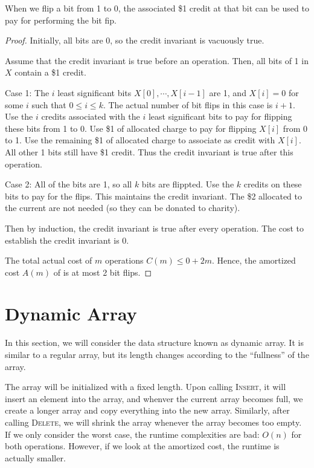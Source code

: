When we flip a bit from 1 to 0, the associated \$1 credit at that bit can be used to pay for performing the bit fip.

\begin{proof}
    Initially, all bits are 0, so the credit invariant is vacuously true.

    Assume that the credit invariant is true before an  operation. Then, all bits of 1 in $X$ contain a \$1 credit.

    Case 1: The $i$ least significant bits $X[0],\cdots,X[i-1]$ are 1, and $X[i] = 0$ for some $i$ such that $0 \leq i \leq k$. The actual number of bit flips in this case is $i+1$. Use the $i$ credits associated with the $i$ least significant bits to pay for flipping these bits from 1 to 0. Use \$1 of allocated charge to pay for flipping $X[i]$ from 0 to 1. Use the remaining \$1 of allocated charge to associate as credit with $X[i]$. All other 1 bits still have \$1 credit. Thus the credit invariant is true after this  operation.

    Case 2: All of the bits are 1, so all $k$ bits are flippted. Use the $k$ credits on these bits to pay for the flips. This maintains the credit invariant. The \$2 allocated to the current  are not needed (so they can be donated to charity).

    Then by induction, the credit invariant is true after every  operation. The cost to establish the credit invariant is 0.

    The total actual cost of $m$ operations $C(m) \leq 0 + 2m$. Hence, the amortized cost $A(m)$ of  is at most 2 bit flips.  
\end{proof}

\section{Dynamic Array}

In this section, we will consider the data structure known as dynamic array. It is similar to a regular array, but its length changes according to the ``fullness'' of the array.


The array will be initialized with a fixed length. Upon calling \textsc{Insert}, it will insert an element into the array, and whenver the current array becomes full, we create a longer array and copy everything into the new array. Similarly, after calling \textsc{Delete}, we will shrink the array whenever the array becomes too empty. If we only consider the worst case, the runtime complexities are bad: $O(n)$ for both operations. However, if we look at the amortized cost, the runtime is actually smaller.

